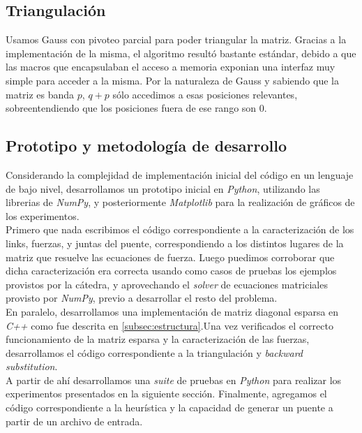 \subsection{Triangulación}
Usamos Gauss con pivoteo parcial para poder triangular la matriz. Gracias a la implementación de la misma, el algoritmo resultó bastante estándar, debido a que las macros que encapsulaban el acceso a memoria exponian una interfaz muy simple para acceder a la misma. Por la naturaleza de Gauss y sabiendo que la matriz es banda $p$, $q + p$ sólo accedimos a esas posiciones relevantes, sobreentendiendo que los posiciones fuera de ese rango son $0$.

 \subsection{Prototipo y metodología de desarrollo}

Considerando la complejidad de implementación inicial del código en un lenguaje de bajo nivel, desarrollamos un prototipo inicial en \textit{Python}, utilizando las librerias de \textit{NumPy}, y posteriormente \textit{Matplotlib} para la realización de gráficos de los experimentos.\\

Primero que nada escribimos el código correspondiente a la caracterización de los links, fuerzas, y juntas del puente, correspondiendo a los distintos lugares de la matriz que resuelve las ecuaciones de fuerza. Luego puedimos corroborar que dicha caracterización era correcta usando como casos de pruebas los ejemplos provistos por la cátedra, y aprovechando el \textit{solver} de ecuaciones matriciales provisto por \textit{NumPy}, previo a desarrollar el resto del problema.\\

En paralelo, desarrollamos una implementación de matriz diagonal esparsa en \textit{C++} como fue descrita en \ref{subsec:estructura}.Una vez verificados el correcto funcionamiento de la matriz esparsa y la caracterización de las fuerzas, desarrollamos el código correspondiente a la triangulación y \textit{backward substitution}.\\

A partir de ahí desarrollamos una \textit{suite} de pruebas en \textit{Python} para realizar los experimentos presentados en la siguiente sección. Finalmente, agregamos el código correspondiente a la heurística y la capacidad de generar un puente a partir de un archivo de entrada.
